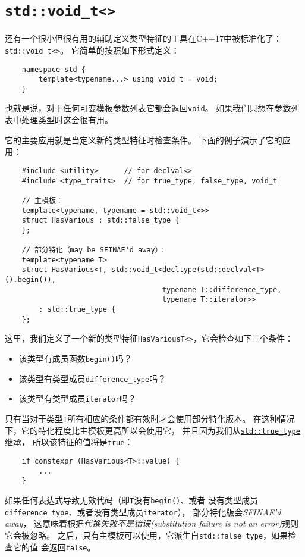 \section{\texttt{std::void\_t<>}}\label{ch33.3}
还有一个很小但很有用的辅助定义类型特征的工具在C++17中被标准化了：\texttt{std::void\_t<>}。
它简单的按照如下形式定义：
\begin{lstlisting}
    namespace std {
        template<typename...> using void_t = void;
    }
\end{lstlisting}
也就是说，对于任何可变模板参数列表它都会返回\texttt{void}。
如果我们只想在参数列表中处理类型时这会很有用。

它的主要应用就是当定义新的类型特征时检查条件。
下面的例子演示了它的应用：
\begin{lstlisting}
    #include <utility>      // for declval<>
    #include <type_traits>  // for true_type, false_type, void_t

    // 主模板：
    template<typename, typename = std::void_t<>>
    struct HasVarious : std::false_type {
    };

    // 部分特化（may be SFINAE'd away）：
    template<typename T>
    struct HasVarious<T, std::void_t<decltype(std::declval<T>().begin()),
                                     typename T::difference_type,
                                     typename T::iterator>>
        : std::true_type {
    };
\end{lstlisting}
这里，我们定义了一个新的类型特征\texttt{HasVariousT<>}，它会检查如下三个条件：
\begin{itemize}
    \item 该类型有成员函数\texttt{begin()}吗？
    \item 该类型有类型成员\texttt{difference\_type}吗？
    \item 该类型有类型成员\texttt{iterator}吗？
\end{itemize}
只有当对于类型\texttt{T}所有相应的条件都有效时才会使用部分特化版本。
在这种情况下，它的特化程度比主模板更高所以会使用它，
并且因为我们从\hyperref[ch33.2]{\texttt{std::true\_type}}继承，
所以该特征的值将是\texttt{true}：
\begin{lstlisting}
    if constexpr (HasVarious<T>::value) {
        ...
    }
\end{lstlisting}
如果任何表达式导致无效代码（即\texttt{T}没有\texttt{begin()}、或者
没有类型成员\texttt{difference\_type}、或者没有类型成员\texttt{iterator}），
部分特化版会\emph{SFINAE'd away}，
这意味着根据\emph{代换失败不是错误(substitution failure is not an error)}规则它会被忽略。
之后，只有主模板可以使用，它派生自\texttt{std::false\_type}，如果检查它的值
会返回\texttt{false}。

